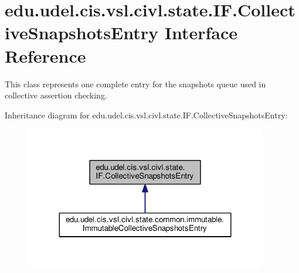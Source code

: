 \hypertarget{interfaceedu_1_1udel_1_1cis_1_1vsl_1_1civl_1_1state_1_1IF_1_1CollectiveSnapshotsEntry}{}\section{edu.\+udel.\+cis.\+vsl.\+civl.\+state.\+I\+F.\+Collective\+Snapshots\+Entry Interface Reference}
\label{interfaceedu_1_1udel_1_1cis_1_1vsl_1_1civl_1_1state_1_1IF_1_1CollectiveSnapshotsEntry}


This class represents one complete entry for the snapshots queue used in collective assertion checking.  




Inheritance diagram for edu.\+udel.\+cis.\+vsl.\+civl.\+state.\+I\+F.\+Collective\+Snapshots\+Entry\+:
\nopagebreak
\begin{figure}[H]
\begin{center}
\leavevmode
\includegraphics[width=299pt]{interfaceedu_1_1udel_1_1cis_1_1vsl_1_1civl_1_1state_1_1IF_1_1CollectiveSnapshotsEntry__inherit__graph}
\end{center}
\end{figure}
